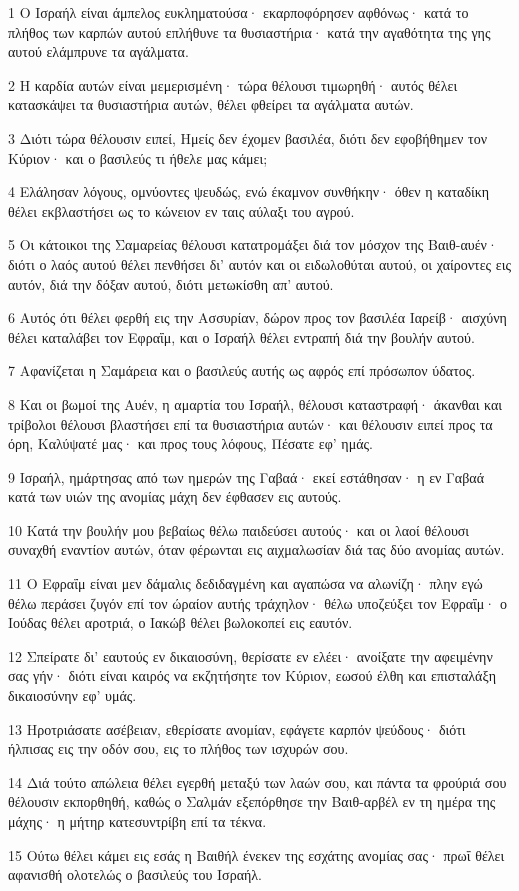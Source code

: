 \par 1 Ο Ισραήλ είναι άμπελος ευκληματούσα· εκαρποφόρησεν αφθόνως· κατά το πλήθος των καρπών αυτού επλήθυνε τα θυσιαστήρια· κατά την αγαθότητα της γης αυτού ελάμπρυνε τα αγάλματα.
\par 2 Η καρδία αυτών είναι μεμερισμένη· τώρα θέλουσι τιμωρηθή· αυτός θέλει κατασκάψει τα θυσιαστήρια αυτών, θέλει φθείρει τα αγάλματα αυτών.
\par 3 Διότι τώρα θέλουσιν ειπεί, Ημείς δεν έχομεν βασιλέα, διότι δεν εφοβήθημεν τον Κύριον· και ο βασιλεύς τι ήθελε μας κάμει;
\par 4 Ελάλησαν λόγους, ομνύοντες ψευδώς, ενώ έκαμνον συνθήκην· όθεν η καταδίκη θέλει εκβλαστήσει ως το κώνειον εν ταις αύλαξι του αγρού.
\par 5 Οι κάτοικοι της Σαμαρείας θέλουσι κατατρομάξει διά τον μόσχον της Βαιθ-αυέν· διότι ο λαός αυτού θέλει πενθήσει δι' αυτόν και οι ειδωλοθύται αυτού, οι χαίροντες εις αυτόν, διά την δόξαν αυτού, διότι μετωκίσθη απ' αυτού.
\par 6 Αυτός ότι θέλει φερθή εις την Ασσυρίαν, δώρον προς τον βασιλέα Ιαρείβ· αισχύνη θέλει καταλάβει τον Εφραΐμ, και ο Ισραήλ θέλει εντραπή διά την βουλήν αυτού.
\par 7 Αφανίζεται η Σαμάρεια και ο βασιλεύς αυτής ως αφρός επί πρόσωπον ύδατος.
\par 8 Και οι βωμοί της Αυέν, η αμαρτία του Ισραήλ, θέλουσι καταστραφή· άκανθαι και τρίβολοι θέλουσι βλαστήσει επί τα θυσιαστήρια αυτών· και θέλουσιν ειπεί προς τα όρη, Καλύψατέ μας· και προς τους λόφους, Πέσατε εφ' ημάς.
\par 9 Ισραήλ, ημάρτησας από των ημερών της Γαβαά· εκεί εστάθησαν· η εν Γαβαά κατά των υιών της ανομίας μάχη δεν έφθασεν εις αυτούς.
\par 10 Κατά την βουλήν μου βεβαίως θέλω παιδεύσει αυτούς· και οι λαοί θέλουσι συναχθή εναντίον αυτών, όταν φέρωνται εις αιχμαλωσίαν διά τας δύο ανομίας αυτών.
\par 11 Ο Εφραΐμ είναι μεν δάμαλις δεδιδαγμένη και αγαπώσα να αλωνίζη· πλην εγώ θέλω περάσει ζυγόν επί τον ώραίον αυτής τράχηλον· θέλω υποζεύξει τον Εφραΐμ· ο Ιούδας θέλει αροτριά, ο Ιακώβ θέλει βωλοκοπεί εις εαυτόν.
\par 12 Σπείρατε δι' εαυτούς εν δικαιοσύνη, θερίσατε εν ελέει· ανοίξατε την αφειμένην σας γήν· διότι είναι καιρός να εκζητήσητε τον Κύριον, εωσού έλθη και επισταλάξη δικαιοσύνην εφ' υμάς.
\par 13 Ηροτριάσατε ασέβειαν, εθερίσατε ανομίαν, εφάγετε καρπόν ψεύδους· διότι ήλπισας εις την οδόν σου, εις το πλήθος των ισχυρών σου.
\par 14 Διά τούτο απώλεια θέλει εγερθή μεταξύ των λαών σου, και πάντα τα φρούριά σου θέλουσιν εκπορθηθή, καθώς ο Σαλμάν εξεπόρθησε την Βαιθ-αρβέλ εν τη ημέρα της μάχης· η μήτηρ κατεσυντρίβη επί τα τέκνα.
\par 15 Ούτω θέλει κάμει εις εσάς η Βαιθήλ ένεκεν της εσχάτης ανομίας σας· πρωΐ θέλει αφανισθή ολοτελώς ο βασιλεύς του Ισραήλ.

